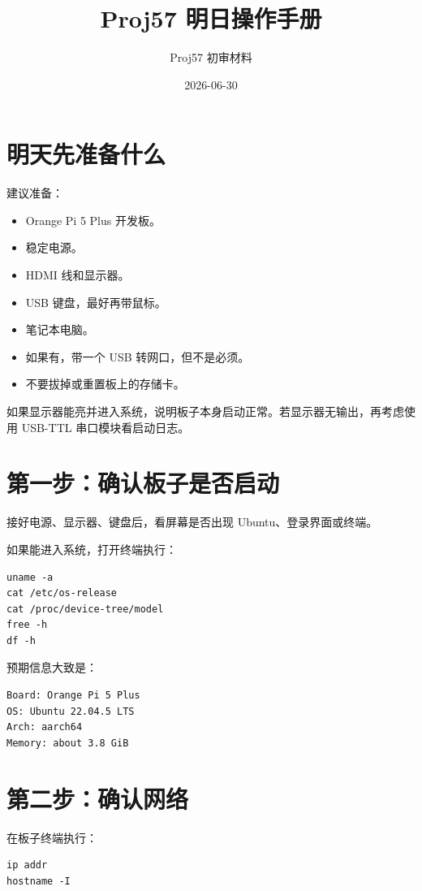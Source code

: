 \documentclass[UTF8,a4paper,11pt]{ctexart}
\title{Proj57 明日操作手册}
\author{Proj57 初审材料}
\date{2026-06-30}
\begin{document}
\maketitle

\section{明天先准备什么}

建议准备：

\begin{itemize}
  \item Orange Pi 5 Plus 开发板。
  \item 稳定电源。
  \item HDMI 线和显示器。
  \item USB 键盘，最好再带鼠标。
  \item 笔记本电脑。
  \item 如果有，带一个 USB 转网口，但不是必须。
  \item 不要拔掉或重置板上的存储卡。
\end{itemize}

如果显示器能亮并进入系统，说明板子本身启动正常。若显示器无输出，再考虑使用 USB-TTL 串口模块看启动日志。

\section{第一步：确认板子是否启动}

接好电源、显示器、键盘后，看屏幕是否出现 Ubuntu、登录界面或终端。

如果能进入系统，打开终端执行：

\begin{verbatim}
uname -a
cat /etc/os-release
cat /proc/device-tree/model
free -h
df -h
\end{verbatim}

预期信息大致是：

\begin{verbatim}
Board: Orange Pi 5 Plus
OS: Ubuntu 22.04.5 LTS
Arch: aarch64
Memory: about 3.8 GiB
\end{verbatim}

\section{第二步：确认网络}

在板子终端执行：

\begin{verbatim}
ip addr
hostname -I
\end{verbatim}
\end{document}
